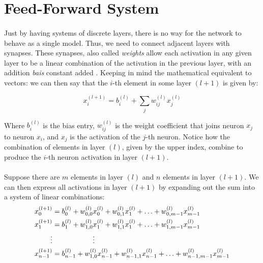 \documentclass[12pt,letterpaper]{article}
\begin{document}
\section{Feed-Forward System}

\paragraph*{}Just by having systems of discrete layers, there is no way for the network to behave as a single model. Thus, we need to connect adjacent layers with synapses. These synapses, also called \textit{weights} allow each activation in any given layer to be a linear combination of the activation in the previous layer, with an addition \textit{bais} constant added \cite{Geron,Loy}. Keeping in mind the mathematical equivalent to vectors: we can then say that the $i$-th element in some layer $(l+1)$ is given by:

\begin{equation}
\label{single element}
x^{(l+1)}_i = b^{(l)}_i + \sum_{j} w^{(l)}_{ij} x^{(l)}_j
\end{equation}

Where $b^{(l)}_i$ is the bias entry, $w^{(l)}_{ij}$ is the weight coefficient that joins neuron $x_j$ to neuron $x_i$, and $x_j$ is the activation of the $j$-th neuron.  Notice how the combination of elements in layer $(l)$, given by the upper index, combine to produce the $i$-th neuron activation in layer $(l+1)$. 

\paragraph*{}Suppose there are $m$ elements in layer $(l)$ and $n$ elements in layer $(l+1)$. We can then express all activations in layer $(l+1)$ by expanding out the sum into a system of linear combinations:
\begin{equation}
\begin{split}
\label{system elements}
x^{(l+1)}_0 &= b^{(l)}_0 + w^{(l)}_{0,0} x^{(l)}_0 + w^{(l)}_{0,1} x^{(l)}_1 + \hdots + w^{(l)}_{0,m-1} x^{(l)}_{m-1}  \\
x^{(l+1)}_1 &= b^{(l)}_1 + w^{(l)}_{1,0} x^{(l)}_1 + w^{(l)}_{1,1} x^{(l)}_1 + \hdots + w^{(l)}_{1,m-1} x^{(l)}_{m-1}  \\
\vdots & \text{\hspace{2cm}} \vdots \\
x^{(l+1)}_{n-1} &= b^{(l)}_{n-1} + w^{(l)}_{1,0} x^{(l)}_{n-1} + w^{(l)}_{n-1,1} x^{(l)}_{n-1} + \hdots + w^{(l)}_{n-1,m-1} x^{(l)}_{m-1}  \\
\end{split}
\end{equation}
\end{document}
